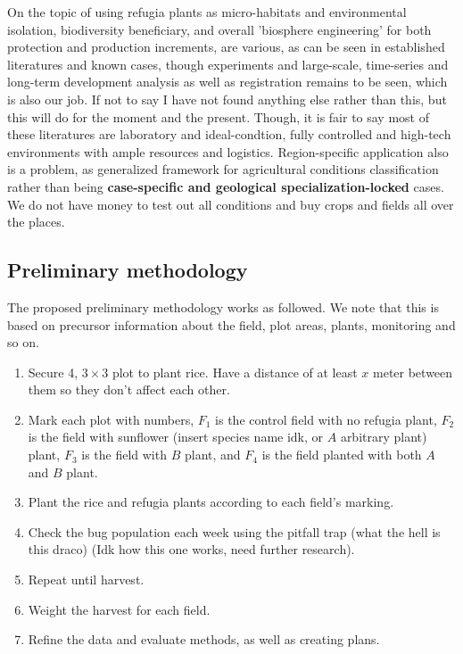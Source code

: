 \documentclass[twocolumn,letterpaper, 12pt]{article}
\begin{document}
On the topic of using refugia plants as micro-habitats and environmental isolation, biodiversity beneficiary, and overall 'biosphere engineering' for both protection and production increments, are various\cite{duff2024ecological,sijabat2026potential,mokoginta2022refugia,boinot2019alley,hardiansyah2021agrobiodiversity}, as can be seen in established literatures and known cases, though experiments and large-scale, time-series and long-term development analysis as well as registration remains to be seen, which is also our job. If not to say I have not found anything else rather than this, but this will do for the moment and the present. Though, it is fair to say most of these literatures are laboratory and ideal-condtion, fully controlled and high-tech environments with ample resources and logistics. Region-specific application also is a problem, as generalized framework for agricultural conditions classification rather than being \textbf{case-specific and geological specialization-locked} cases. We do not have money to test out all conditions and buy crops and fields all over the places. 

\subsection{Preliminary methodology}

The proposed preliminary methodology works as followed. We note that this is based on precursor information about the field, plot areas, plants, monitoring and so on. 

\begin{enumerate}
    \item Secure 4, $3\times 3$ plot to plant rice. Have a distance of at least $x$ meter between them so they don’t affect each other.
    \item Mark each plot with numbers, $F_1$ is the control field with no refugia plant, $F_2$ is the field with sunflower (insert species name idk, or $A$ arbitrary plant) plant, $F_3$ is the field with $B$ plant, and $F_4$ is the field planted with both $A$ and $B$ plant.
    \item Plant the rice and refugia plants according to each field’s marking.
    \item Check the bug population each week using the pitfall trap (what the hell is this draco) (Idk how this one works, need further research).
    \item Repeat until harvest. 
    \item Weight the harvest for each field. 
    \item Refine the data and evaluate methods, as well as creating plans. 
\end{enumerate}
\end{document}
